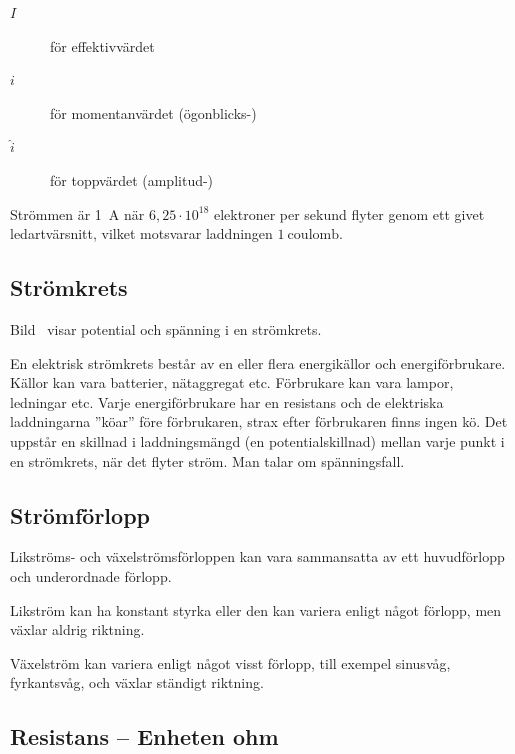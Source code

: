 \begin{description}
\item[\(I\)] för effektivvärdet
\item[\(i\)] för momentanvärdet (ögonblicks-)
\item[\(\hat{i}\)] för toppvärdet (amplitud-)
\end{description}

Strömmen är \qty{1}{\ampere} när \(6,25 \cdot 10^{18}\) elektroner per sekund
flyter genom ett givet ledartvärsnitt, vilket motsvarar laddningen
\(1\ \mathrm{coulomb}\).

\subsection{Strömkrets}
\label{subsec:stroemkrets}


Bild~ visar potential och spänning i en strömkrets.

En elektrisk strömkrets består av en eller flera energikällor och
energiförbrukare.
Källor kan vara batterier, nätaggregat etc.
Förbrukare kan vara lampor, ledningar etc.
Varje energiförbrukare har en resistans och de elektriska laddningarna ''köar''
före förbrukaren, strax efter förbrukaren finns ingen kö.
Det uppstår en skillnad i laddningsmängd (en potentialskillnad) mellan varje
punkt i en strömkrets, när det flyter ström.
Man talar om spänningsfall.

\subsection{Strömförlopp}

Likströms- och växelströmsförloppen kan vara sammansatta av ett huvudförlopp och
underordnade förlopp.

Likström kan ha konstant styrka eller den kan variera enligt något förlopp, men
växlar aldrig riktning.

Växelström kan variera enligt något visst förlopp, till exempel sinusvåg,
fyrkantsvåg, och växlar ständigt riktning.

\subsection{Resistans -- Enheten ohm}
\label{resistans}

